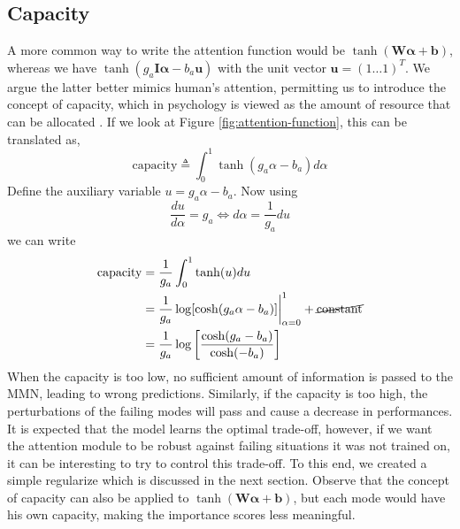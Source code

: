 \subsection*{Capacity}
A more common way to write the attention function would be $\tanh(\mathbf{W}\bm{\alpha}+\mathbf{b})$, whereas we have $\tanh(g_a\mathbf{I}\bm{\alpha}-b_a\mathbf{u})$ with the unit vector $\mathbf{u} = (1 \ldots 1)^T$. We argue the latter better mimics human's attention, permitting us to introduce the concept of capacity, which in psychology is viewed as the amount of resource that can be allocated \citep{attention-is-effort}. If we look at Figure \ref{fig:attention-function}, this can be translated as,
\begin{equation}
\text{capacity} \triangleq \int_0^1 \tanh(g_a\alpha - b_a)d\alpha 
\end{equation}
Define the auxiliary variable $u = g_a\alpha - b_a$. Now using
\begin{equation}
\frac{du}{d\alpha} = g_a \Leftrightarrow d\alpha = \frac{1}{g_a}du
\end{equation}
we can write 
\begin{equation}
\begin{split}
\text{capacity} &= \frac{1}{g_a} \int_0^1 \tanh(u)du  \\
&= \frac{1}{g_a}\log[\cosh(g_a\alpha - b_a)]\bigg\rvert_{\alpha = 0}^1 + \cancel{\text{constant}} \\
&= \frac{1}{g_a}\log\bigg[\frac{\cosh(g_a - b_a)}{\cosh(-b_a)}\bigg]
\end{split}
\end{equation}
When the capacity is too low, no sufficient amount of information is passed to the MMN, leading to wrong predictions. Similarly, if the capacity is too high, the perturbations of the failing modes will pass and cause a decrease in performances. It is expected that the model learns the optimal trade-off, however, if we want the attention module to be robust against failing situations it was not trained on, it can be interesting to try to control this trade-off. To this end, we created a simple regularize which is discussed in the next section. Observe that the concept of capacity can also be applied to $\tanh(\mathbf{W}\bm{\alpha}+\mathbf{b})$, but each mode would have his own capacity, making the importance scores less meaningful.



